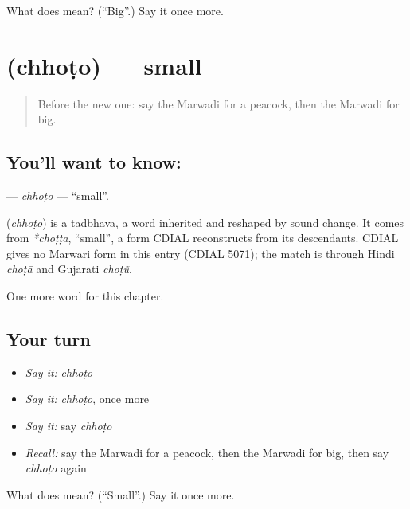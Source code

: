 \begin{tcolorbox}[breakable,colback=teal!4,colframe=teal!35!black,title={Before you move on}]
What does  mean? (\textquotedblleft{}Big\textquotedblright{}.) Say it once more.
\end{tcolorbox}
\section[\texorpdfstring{\mw{छोटो} (chhoṭo)}{छोटो (chhoṭo)}]{ (chhoṭo) — small}

\label{lesson:MW-C72-chhoto}



\begin{quote}
Before the new one: say the Marwadi for a peacock, then the Marwadi for big.
\end{quote}

\subsection*{You'll want to know: }
\textbf{} — \emph{chhoṭo} — \textquotedblleft{}small\textquotedblright{}.

\begin{cousinweb}
\textbf{} (\emph{chhoṭo}) is a tadbhava, a word inherited and reshaped by sound change. It comes from \emph{*choṭṭa}, \textquotedblleft{}small\textquotedblright{}, a form CDIAL reconstructs from its descendants. CDIAL gives no Marwari form in this entry (CDIAL 5071); the match is through Hindi \emph{choṭā} and Gujarati \emph{choṭũ}.
\end{cousinweb}

\begin{grammarlens}[title={What you've built}]
One more word for this chapter.
\end{grammarlens}

\subsection*{Your turn}
\begin{itemize}
\raggedright
  \item \emph{Say it:} \emph{chhoṭo}
  \item \emph{Say it:} \emph{chhoṭo}, once more
  \item \emph{Say it:} say \emph{chhoṭo}
  \item \emph{Recall:} say the Marwadi for a peacock, then the Marwadi for big, then say \emph{chhoṭo} again
\end{itemize}

\begin{tcolorbox}[breakable,colback=teal!4,colframe=teal!35!black,title={Before you move on}]
What does  mean? (\textquotedblleft{}Small\textquotedblright{}.) Say it once more.
\end{tcolorbox}
